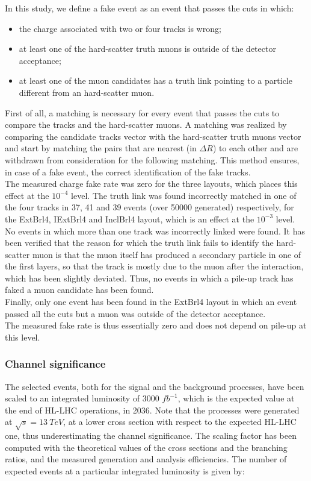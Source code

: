 \documentclass[a4paper,twoside,12pt]{article}
\begin{document}
In this study, we define a fake event as an event that passes the cuts in which:\\
\begin{itemize}
\item the charge associated with two or four tracks is wrong;
\item at least one of the hard-scatter truth muons is outside of the detector acceptance;
\item at least one of the muon candidates has a truth link pointing to a particle different
from an hard-scatter muon.
\end{itemize}

First of all, a matching is necessary for every event that passes the cuts to compare 
the tracks and the hard-scatter muons. A matching was realized by comparing the candidate
tracks vector with the hard-scatter truth muons vector and start by matching the pairs
that are nearest (in $\Delta R$) to each other and are withdrawn from consideration for 
the following matching. This method ensures, in case of a fake event, the correct
identification of the fake tracks. \\

The measured charge fake rate was zero for the three layouts, which places this
effect at the $10^{-4}$ level. The truth link was found incorrectly matched in one of the
four tracks in 37, 41 and 39 events (over 50000 generated) respectively, for the ExtBrl4, IExtBrl4
and InclBrl4 layout, which is an effect at the $10^{-3}$ level. No events in which more than one
track was incorrectly linked were found.  It has been verified that the reason for which 
the truth link fails to identify the hard-scatter muon is that the muon itself has produced
a secondary particle in one of the first layers, so that the track is mostly due to the muon
after the interaction, which has been slightly deviated. Thus, no events in which a pile-up 
track has faked a muon candidate has been found.\\

Finally, only one event has been found in the ExtBrl4 layout
in which an event passed all the cuts but a muon was outside of the detector acceptance.\\

The measured fake rate is thus essentially zero and does not depend on pile-up at this level.

\subsubsection*{Channel significance}
The selected events, both for the signal and the background processes, have been
scaled to an integrated luminosity of 3000 $fb^{-1}$, which is the expected
value at the end of HL-LHC operations, in 2036. Note that the processes
were generated at $\sqrt{s} = 13\ TeV$, at a lower cross section with respect
to the expected HL-LHC one, thus underestimating the channel significance. The scaling factor has been
computed with the theoretical values of the cross sections and the branching ratios,
and the measured generation and analysis efficiencies. The number of expected
events at a particular integrated luminosity is given by: 
\end{document}

